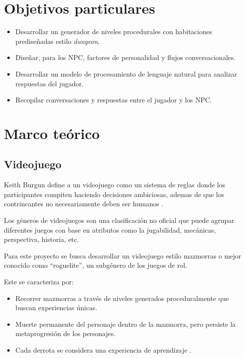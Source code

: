 \documentclass[12pt,twoside]{article}
\begin{document}
	\section{Objetivos particulares}
	
	\begin{itemize}[noitemsep]
		\item Desarrollar un generador de niveles procedurales con habitaciones prediseñadas estilo \textit{dungeon}.
		\item Diseñar, para los NPC, factores de personalidad y flujos conversacionales.
		\item Desarrollar  un modelo  de procesamiento de lenguaje natural para analizar respuestas del jugador.
		\item Recopilar conversaciones y respuestas entre el jugador y los NPC.
	\end{itemize}
	
	\clearpage
	
	\section{Marco teórico}
	
	\subsection{Videojuego}
	
	Keith Burgun define a un videojuego como un sistema de reglas donde los participantes compiten haciendo decisiones ambiciosas, ademas de que los contrincantes no necesariamente deben ser humanos \cite{info: videojuego1}.
	
	Los géneros  de videojuegos son una clasificación no oficial que puede agrupar diferentes juegos con base en atributos como la jugabilidad, mecánicas, perspectiva, historia, etc. 
	
	Para este proyecto se busca desarrollar un videojuego estilo mazmorras o mejor conocido como ``roguelite'', un subgénero de los juegos de rol.
	
	Este se caracteriza por: 
	\begin{itemize}[noitemsep]
		\item Recorrer mazmorras a través de niveles generados proceduralmente que buscan experiencias únicas. 
		\item Muerte permanente del personaje dentro de la mazmorra, pero persiste la metaprogresión de los personajes.
		\item Cada derrota se considera una experiencia de aprendizaje \cite{info: videojuego2}.
	\end{itemize}
	
\end{document}
